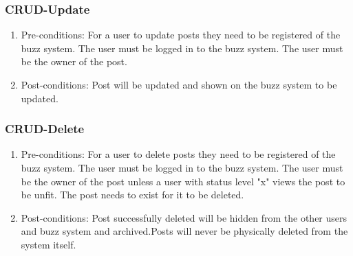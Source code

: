 \documentclass[hidelinks, 12pt, oneside]{article}
\begin{document}
\subsubsection{CRUD-Update}
\begin{enumerate}
 \item Pre-conditions:  For a user to update posts they need to be registered of the buzz system. The user must be logged in to the buzz system. The user must be the owner of the post.
 \\
 \item Post-conditions: Post will be updated and shown on the buzz system to be updated.
   \\

\end{enumerate}

\subsubsection{CRUD-Delete}
\begin{enumerate}
 \item Pre-conditions:  For a user to delete posts they need to be registered of the buzz system. The user must be logged in to the buzz system. The user must be the owner of the post unless a user with status level "x" views the post to be unfit. The post needs to exist for it to be deleted.
 \\
 \item Post-conditions: Post successfully deleted will be hidden from the other users and buzz system and archived.Posts will never be physically deleted from the system itself.
   \\

\end{enumerate}
\end{document}

